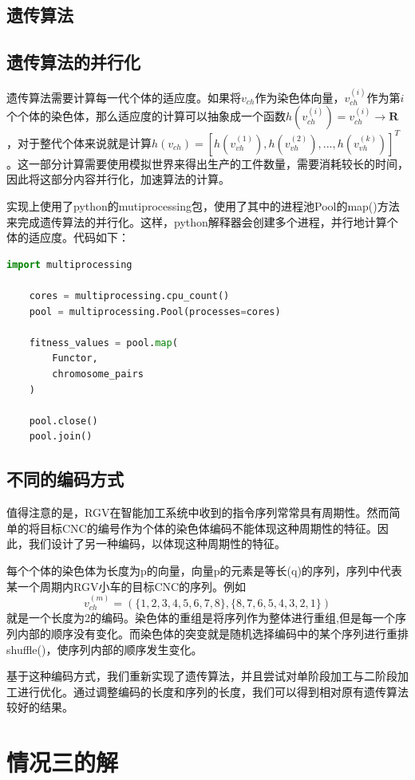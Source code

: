 \documentclass{cumcmthesis}
\begin{document}
	\subsection{遗传算法}
	\subsection{遗传算法的并行化}
	遗传算法需要计算每一代个体的适应度。如果将$v_{ch}$作为染色体向量，$v_{ch}^{(i)}$作为第$i$个个体的染色体，那么适应度的计算可以抽象成一个函数$h(v_{ch}^{(i)})=v_{ch}^{(i)}\rightarrow\mathbf{R}$，对于整代个体来说就是计算$h(v_{ch})=[h(v_{vh}^{(1)}),h(v_{vh}^{(2)}),...,h(v_{vh}^{(k)})]^T$。这一部分计算需要使用模拟世界来得出生产的工件数量，需要消耗较长的时间，因此将这部分内容并行化，加速算法的计算。
	
	实现上使用了python的mutiprocessing包，使用了其中的进程池Pool的map()方法来完成遗传算法的并行化。这样，python解释器会创建多个进程，并行地计算个体的适应度。代码如下：
	\begin{lstlisting}[language=python]
	import multiprocessing
	
	cores = multiprocessing.cpu_count()
	pool = multiprocessing.Pool(processes=cores)
	
	fitness_values = pool.map(
		Functor,
		chromosome_pairs
	)
	
	pool.close()
	pool.join()
	\end{lstlisting}
	
	\subsection{不同的编码方式}
	
	值得注意的是，RGV在智能加工系统中收到的指令序列常常具有周期性。然而简单的将目标CNC的编号作为个体的染色体编码不能体现这种周期性的特征。因此，我们设计了另一种编码，以体现这种周期性的特征。
	
	每个个体的染色体为长度为p的向量，向量p的元素是等长(q)的序列，序列中代表某一个周期内RGV小车的目标CNC的序列。例如$$v_{ch}^{(m)} = (\{1,2,3,4,5,6,7,8\},\{8,7,6,5,4,3,2,1\})$$就是一个长度为2的编码。染色体的重组是将序列作为整体进行重组,但是每一个序列内部的顺序没有变化。而染色体的突变就是随机选择编码中的某个序列进行重排shuffle()，使序列内部的顺序发生变化。
	
	基于这种编码方式，我们重新实现了遗传算法，并且尝试对单阶段加工与二阶段加工进行优化。通过调整编码的长度和序列的长度，我们可以得到相对原有遗传算法较好的结果。

	\section{情况三的解}
\end{document}
